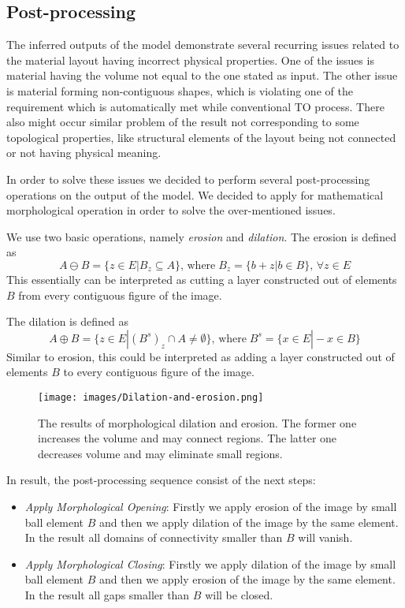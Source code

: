 \subsection{Post-processing}

The inferred outputs of the model demonstrate several recurring issues related to the material layout having incorrect physical properties.
One of the issues is material having the volume not equal to the one stated as input.
The other issue is material forming non-contiguous shapes, which is violating one of the requirement which is automatically met while conventional TO process.
There also might occur similar problem of the result not corresponding to some topological properties, like structural elements of the layout being not connected or not having physical meaning.
\medskip

In order to solve these issues we decided to perform several post-processing operations on the output of the model.
We decided to apply for mathematical morphological operation in order to solve the over-mentioned issues.
\medskip

We use two basic operations, namely \emph{erosion} and \emph{dilation}\cite{}.
The erosion is defined as 
\begin{equation}
A \ominus B = \{z \in E | B_{z} \subseteq A \}, \, \mathrm{where} \; B_{z}=\{ b+z | b \in B \}, \, \forall z \in E 
\end{equation} 
This essentially can be interpreted as cutting a layer constructed out of elements $B$ from every contiguous figure of the image.
\medskip

The dilation is defined as 
\begin{equation}
A \oplus B = \{z \in E | (B^{s})_{z} \cap  A \neq \emptyset \}, \, \mathrm{where} \; B^{s}=\{x \in E | -x \in B \}
\end{equation} 
Similar to erosion, this could be interpreted as adding a layer constructed out of elements $B$ to every contiguous figure of the image. 
\medskip
\begin{figure}
	\centering
	\texttt{[image: images/Dilation-and-erosion.png]}
	\label{fig:dil-eros}
	\caption{The results of morphological dilation and erosion. The former one increases the volume and may connect regions. The latter one decreases volume and may eliminate small regions. }
\end{figure}
\medskip

In result, the post-processing sequence consist of the next steps:
\begin{itemize}
	\item \emph{Apply Morphological Opening}: Firstly we apply erosion of the image by small ball element $B$ and then we apply dilation of the image by the same element. In the result all domains of connectivity smaller than $B$ will vanish.
	\item \emph{Apply Morphological Closing}: Firstly we apply dilation of the image by small ball element $B$ and then we apply erosion of the image by the same element. In the result all gaps smaller than $B$ will be closed.
\end{itemize}
\medskip

